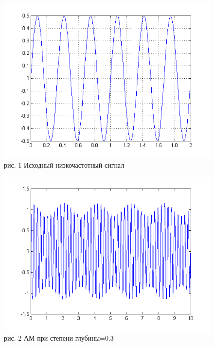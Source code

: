 \documentclass[10pt,a4paper]{report}
\begin{document}
\begin{figure}
\begin{center}
\includegraphics[angle=0, scale = 0.8]{1_1.png}\newline
рис. 1  Исходный низкочастотный сигнал\newline
\end{center}
\end{figure}
\begin{figure}
\begin{center}
\includegraphics[angle=0, scale = 0.8]{1_2.png}\newline
рис. 2  АМ при степени глубины=0.3\newline
\end{center}
\end{figure}
\end{document}
